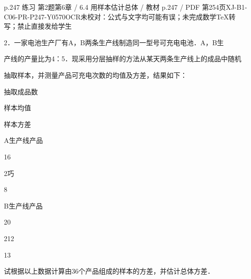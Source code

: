 \begin{bankitem}{p.247 练习 第2题}{第6章 / 6.4 用样本估计总体 / 教材 p.247 / PDF 第254页}{XJ-B1-C06-PR-P247-Y0570}{OCR未校对：公式与文字均可能有误；未完成数学TeX转写；禁止直接发给学生}
\begin{ocrdraft}
\par
2．一家电池生产厂有A，B两条生产线制造同一型号可充电电池．A，B生
\par
产线的产量比为4：5．现采用分层抽样的方法从某天两条生产线上的成品中随机
\par
抽取样本，并测量产品可充电次数的均值及方差，结果如下：
\par
抽取成品数
\par
样本均值
\par
样本方差
\par
A生产线产品
\par
16
\par
2巧
\par
8
\par
B生产线产品
\par
20
\par
212
\par
13
\par
试根据以上数据计算由36个产品组成的样本的方差，并估计总体方差．
\end{ocrdraft}
\end{bankitem}
